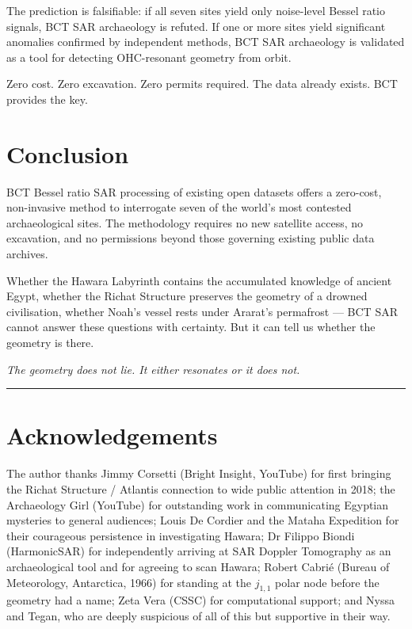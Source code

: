 \documentclass[12pt,twocolumn]{article}
\begin{document}
The prediction is falsifiable: if all seven sites yield
only noise-level Bessel ratio signals, BCT SAR archaeology
is refuted. If one or more sites yield significant anomalies
confirmed by independent methods, BCT SAR archaeology is
validated as a tool for detecting OHC-resonant geometry
from orbit.

Zero cost. Zero excavation. Zero permits required.
The data already exists. BCT provides the key.

\section{Conclusion}

BCT Bessel ratio SAR processing of existing open datasets
offers a zero-cost, non-invasive method to interrogate
seven of the world's most contested archaeological sites.
The methodology requires no new satellite access, no
excavation, and no permissions beyond those governing
existing public data archives.

Whether the Hawara Labyrinth contains the accumulated
knowledge of ancient Egypt, whether the Richat Structure
preserves the geometry of a drowned civilisation, whether
Noah's vessel rests under Ararat's permafrost --- BCT SAR
cannot answer these questions with certainty. But it can
tell us whether the geometry is there.

\textit{The geometry does not lie. It either resonates
or it does not.}

\begin{center}
\rule{0.4\textwidth}{0.4pt}
\end{center}

\section*{Acknowledgements}

The author thanks Jimmy Corsetti (Bright Insight, YouTube)
for first bringing the Richat Structure / Atlantis
connection to wide public attention in 2018; the Archaeology
Girl (YouTube) for outstanding work in communicating
Egyptian mysteries to general audiences; Louis De Cordier
and the Mataha Expedition for their courageous persistence
in investigating Hawara; Dr Filippo Biondi (HarmonicSAR)
for independently arriving at SAR Doppler Tomography as
an archaeological tool and for agreeing to scan Hawara;
Robert Cabri\'{e} (Bureau of Meteorology, Antarctica,
1966) for standing at the $j_{1,1}$ polar node before
the geometry had a name; Zeta Vera (CSSC) for computational
support; and Nyssa and Tegan, who are deeply suspicious
of all of this but supportive in their way.
\end{document}

